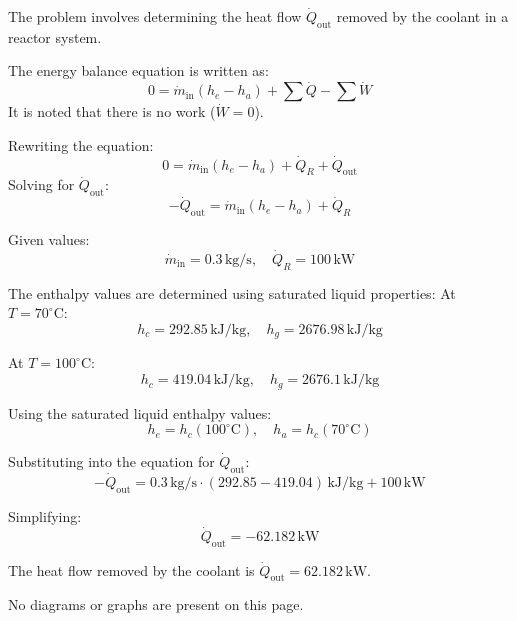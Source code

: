 The problem involves determining the heat flow \( \dot{Q}_{\text{out}} \) removed by the coolant in a reactor system.  

The energy balance equation is written as:  
\[
0 = \dot{m}_{\text{in}} (h_e - h_a) + \sum \dot{Q} - \sum \dot{W}
\]  
It is noted that there is no work (\( \dot{W} = 0 \)).  

Rewriting the equation:  
\[
0 = \dot{m}_{\text{in}} (h_e - h_a) + \dot{Q}_R + \dot{Q}_{\text{out}}
\]  
Solving for \( \dot{Q}_{\text{out}} \):  
\[
-\dot{Q}_{\text{out}} = \dot{m}_{\text{in}} (h_e - h_a) + \dot{Q}_R
\]  

Given values:  
\[
\dot{m}_{\text{in}} = 0.3 \, \text{kg/s}, \quad \dot{Q}_R = 100 \, \text{kW}
\]  

The enthalpy values are determined using saturated liquid properties:  
At \( T = 70^\circ\text{C} \):  
\[
h_c = 292.85 \, \text{kJ/kg}, \quad h_g = 2676.98 \, \text{kJ/kg}
\]  

At \( T = 100^\circ\text{C} \):  
\[
h_c = 419.04 \, \text{kJ/kg}, \quad h_g = 2676.1 \, \text{kJ/kg}
\]  

Using the saturated liquid enthalpy values:  
\[
h_e = h_c(100^\circ\text{C}), \quad h_a = h_c(70^\circ\text{C})
\]  

Substituting into the equation for \( \dot{Q}_{\text{out}} \):  
\[
-\dot{Q}_{\text{out}} = 0.3 \, \text{kg/s} \cdot (292.85 - 419.04) \, \text{kJ/kg} + 100 \, \text{kW}
\]  

Simplifying:  
\[
\dot{Q}_{\text{out}} = -62.182 \, \text{kW}
\]  

The heat flow removed by the coolant is \( \dot{Q}_{\text{out}} = 62.182 \, \text{kW} \).  

No diagrams or graphs are present on this page.